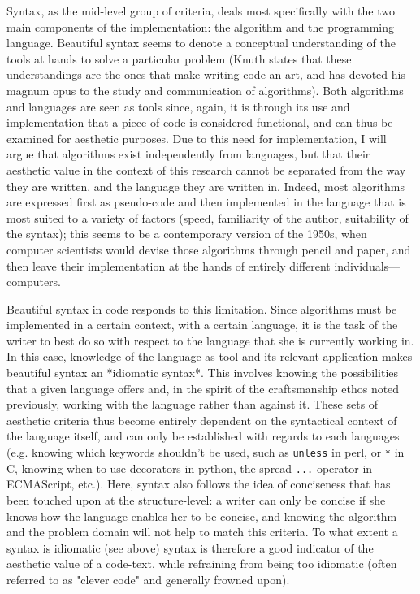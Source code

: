 Syntax, as the mid-level group of criteria, deals most specifically with the two main components of the implementation: the algorithm and the programming language. Beautiful syntax seems to denote a conceptual understanding of the tools at hands to solve a particular problem (Knuth states that these understandings are the ones that make writing code an art, and has devoted his magnum opus to the study and communication of algorithms). Both algorithms and languages are seen as tools since, again, it is through its use and implementation that a piece of code is considered functional, and can thus be examined for aesthetic purposes. Due to this need for implementation, I will argue that algorithms exist independently from languages, but that their aesthetic value in the context of this research cannot be separated from the way they are written, and the language they are written in. Indeed, most algorithms are expressed first as pseudo-code and then implemented in the language that is most suited to a variety of factors (speed, familiarity of the author, suitability of the syntax); this seems to be a contemporary version of the 1950s, when computer scientists would devise those algorithms through pencil and paper, and then leave their implementation at the hands of entirely different individuals—computers.

Beautiful syntax in code responds to this limitation. Since algorithms must be implemented in a certain context, with a certain language, it is the task of the writer to best do so with respect to the language that she is currently working in. In this case, knowledge of the language-as-tool and its relevant application makes beautiful syntax an *idiomatic syntax*. This involves knowing the possibilities that a given language offers and, in the spirit of the craftsmanship ethos noted previously, working with the language rather than against it. These sets of aesthetic criteria thus become entirely dependent on the syntactical context of the language itself, and can only be established with regards to each languages (e.g. knowing which keywords shouldn't be used, such as \lstinline{unless} in perl, or \lstinline{*} in C, knowing when to use decorators in python, the spread \lstinline{...} operator in ECMAScript, etc.). Here, syntax also follows the idea of conciseness that has been touched upon at the structure-level: a writer can only be concise if she knows how the language enables her to be concise, and knowing the algorithm and the problem domain will not help to match this criteria. To what extent a syntax is idiomatic (see above) syntax is therefore a good indicator of the aesthetic value of a code-text, while refraining from being too idiomatic (often referred to as "clever code" and generally frowned upon).

